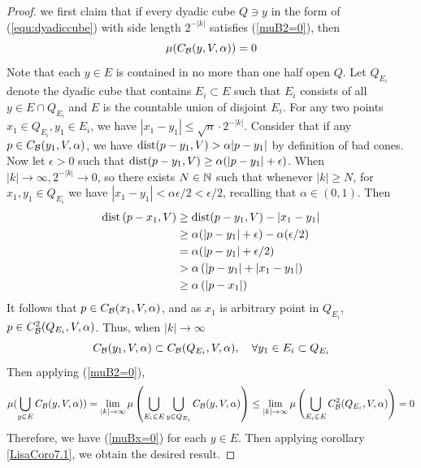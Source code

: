 \begin{proof}
    we first claim that if every dyadic cube $Q\ni y$ in the form of (\ref{equ:dyadiccube}) with side length $2^{-|k|}$ satisfies (\ref{muB2=0}), 
    then
    \begin{equation}\label{muBx=0}
        \mu(C_\mathcal B(y, V, \alpha)) = 0
    \end{equation}
    Note that each $y\in E$ is contained in no more than one half open $Q$. Let $Q_{E_i}$ denote the dyadic cube that contains $E_i\subset E$ such that $E_i$ consists of all $y\in E\cap Q_{E_i}$ and $E$ is the countable union of disjoint $E_i$. For any two points $x_1\in Q_{E_i}, y_1\in E_i$, we have $|x_1-y_1|\leq \sqrt{n}\cdot 2^{-|k|}$. Consider that if any $p\in C_\mathcal B(y_1, V, \alpha)$, we have $\operatorname{dist}(p-y_1, V) > \alpha|p-y_1|$ by definition of bad cones. Now let $\epsilon>0$ such that $\operatorname{dist}(p-y_1, V) \geq \alpha (|p-y_1|+\epsilon)$. When $|k|\rightarrow \infty, 2^{-|k|}\rightarrow 0$, so there exists $N\in\mathbb{N}$ such that whenever $|k|\geq N$, for $x_1, y_1\in Q_{E_i}$ we have $|x_1-y_1|<\alpha\epsilon/2<\epsilon/2$, recalling that $\alpha\in(0,1)$. Then
\begin{equation*}
    \begin{aligned} 
        \operatorname{dist}\left(p-x_1, V\right) & \geq \operatorname{dist}(p-y_1, V)-\left|x_1-y_1\right| \\ 
        & \geq \alpha(|p-y_1|+\epsilon)-\alpha(\epsilon / 2) \\ 
        & =\alpha(|p-y_1|+\epsilon / 2) \\ 
        & >\alpha\left(|p-y_1|+\left|x_1-y_1\right|\right) \\ 
        & \geq \alpha\left(\left|p-x_1\right|\right) 
\end{aligned}
\end{equation*}
It follows that $p\in C_{\mathcal B}(x_1, V, \alpha)$, and as $x_1$ is arbitrary point in $Q_{E_i}$, $p\in C_\mathcal B^2(Q_{E_i}, V, \alpha)$. Thus, when $|k|\rightarrow \infty$
\begin{equation}\label{eq:CysubsetCQ}
    C_{\mathcal B}(y_1, V, \alpha)\subset C_\mathcal B(Q_{E_i}, V, \alpha),\quad \forall y_1\in E_i \subset Q_{E_i}
\end{equation}
Then applying (\ref{muB2=0}), 
\begin{equation*}
    \begin{split}
        \mu(\bigcup_{y\in E}C_\mathcal B(y, V, \alpha))
        = \lim_{|k|\rightarrow \infty}\mu\left( \bigcup_{E_i\in E}\bigcup_{y\in Q_{E_i}} C_\mathcal B(y, V, \alpha) \right)  
        \leq \lim_{|k|\rightarrow\infty}\mu\left( \bigcup_{E_i\in E} C_\mathcal B^2(Q_{E_i}, V, \alpha) \right)
        = 0
    \end{split}
\end{equation*}
Therefore, we have (\ref{muBx=0}) for each $y\in E$. Then applying corollary \ref{LisaCoro7.1}, we obtain the desired result. 
\end{proof}



